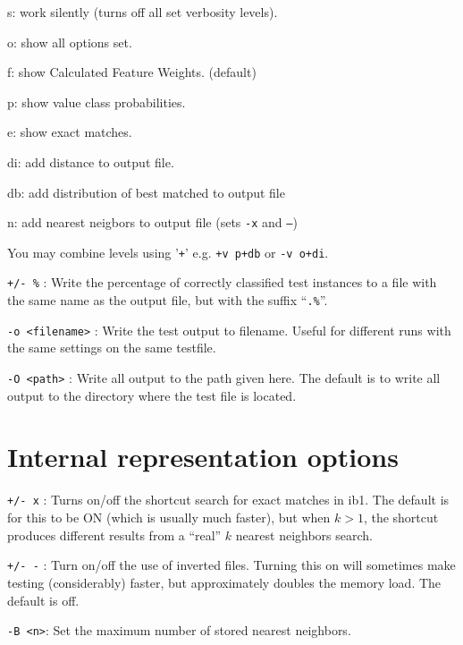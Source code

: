 \documentclass{report}
\begin{document}
\begin{description}
	\begin{description}
         \item s:  work silently (turns off all set verbosity levels).
         \item o:  show all options set.
         \item f:  show Calculated Feature Weights. (default)
         \item p:  show value class probabilities.
         \item e:  show exact matches.
         \item di: add distance to output file.
         \item db: add distribution of best matched to output file
         \item n:  add nearest neigbors to output file (sets {\tt -x}
         and {\tt --})
	\item You may combine levels using '{\tt +}' e.g. {\tt +v
         p+db} or {\tt -v o+di}.
	\end{description}

\item {\tt +/- \%} : Write the percentage of correctly classified test
                 instances to a file with the same name as the output
                 file, but with the suffix ``{\tt .\%}''.

\item {\tt -o <filename>} : Write the test output to filename. Useful
for different runs with the same settings on the same testfile.

\item {\tt -O <path>} : Write all output to the path given here. The
default is to write all output to the directory where the test file
is located.

\end{description}

\section{Internal representation options}

\begin{description}

\item {\tt +/- x} : Turns on/off the shortcut search for exact matches in
{\sc ib1}. The default is for this to be ON (which is usually much faster),
but when $k>1$, the shortcut produces different results from a
``real'' $k$ nearest neighbors search.

\item {\tt +/- -} : Turn on/off the use of inverted files. Turning
this on will sometimes make testing (considerably) faster, but
approximately doubles the memory load. The default is off.

\item {\tt -B <n>}: Set the maximum number of stored nearest neighbors.

\end{description}
\end{document}
